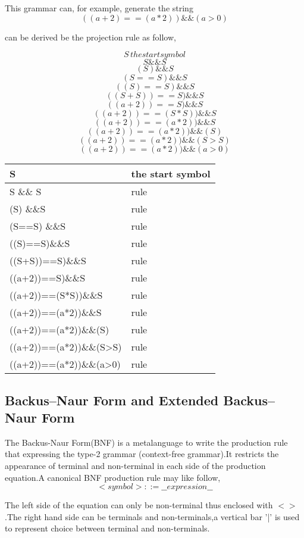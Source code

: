 This grammar can, for example, generate the string 
$$  ((a+2) == (a*2) )\&\& (a > 0)  $$

can be derived be the projection rule as follow,

 $$ S \,the start symbol $$   
 $$ S \&\& S$$
$$ (S) \&\&S $$
$$ (S==S) \&\&S $$
$$ ((S)==S)\&\&S $$
$$ ((S+S))==S)\&\&S $$
$$ ((a+2))==S)\&\&S $$
$$  ((a+2))==(S*S))\&\&S $$
$$  ((a+2))==(a*2))\&\&S $$
$$  ((a+2))==(a*2))\&\&(S) $$
$$ ((a+2))==(a*2))\&\&(S>S) $$
$$  ((a+2))==(a*2))\&\&(a>0) $$
 
\begin{tabular}{|l|l|}
\hline S & the start symbol\\ 
\hline S \&\& S & rule  \\ 
\hline  (S) \&\&S & rule \\ 
\hline   (S==S) \&\&S & rule \\ 
\hline  ((S)==S)\&\&S  & rule  \\ 
\hline ((S+S))==S)\&\&S & rule \\
\hline ((a+2))==S)\&\&S & rule \\
\hline  ((a+2))==(S*S))\&\&S & rule \\
\hline  ((a+2))==(a*2))\&\&S & rule \\
\hline ((a+2))==(a*2))\&\&(S)  & rule \\
\hline ((a+2))==(a*2))\&\&(S>S) & rule \\
\hline ((a+2))==(a*2))\&\&(a>0) & rule \\
\hline 
\end{tabular} 
 
 






\subsection{Backus–Naur Form and Extended Backus–Naur Form}
The Backus-Naur Form(BNF) is a metalanguage to write the production rule that expressing the type-2 grammar (context-free grammar).It  restricts the appearance of terminal and non-terminal in each side of the production equation.A canonical BNF production rule may like follow,
 \[   <symbol> ::= \_\_expression\_\_ \]
 
The left side of the equation can only be non-terminal thus enclosed with $<>$ .The right hand side can be terminals and non-terminals,a vertical bar '|' is used to represent choice between terminal and non-terminals.\\

